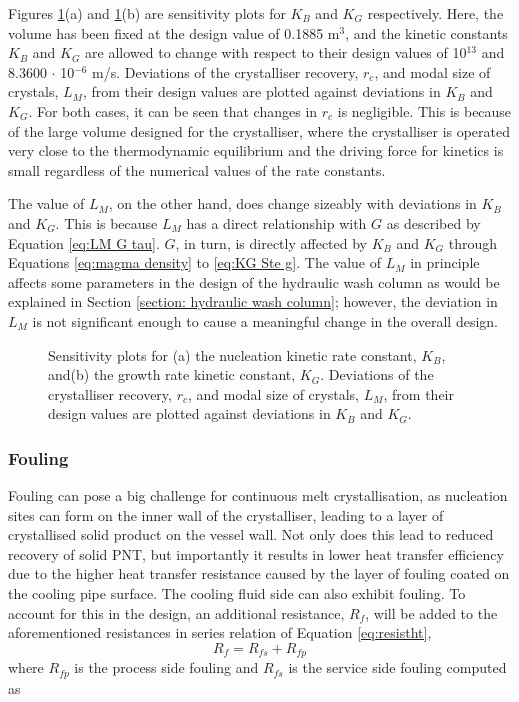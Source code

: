 Figures \ref{fig:sensitivity kinetics}(a) and \ref{fig:sensitivity kinetics}(b) are sensitivity plots for $K_B$ and $K_G$ respectively. Here, the volume has been fixed at the design value of 0.1885 m$^3$, and the kinetic constants $K_B$ and $K_G$ are allowed to change with respect to their design values of 10$^{13}$ and 8.3600 $\cdot$ 10$^{-6}$ m/s. Deviations of the crystalliser recovery, $r_c$, and modal size of crystals, $L_M$, from their design values are plotted against deviations in $K_B$ and $K_G$. For both cases, it can be seen that changes in $r_c$ is negligible. This is because of the large volume designed for the crystalliser, where the crystalliser is operated very close to the thermodynamic equilibrium and the driving force for kinetics is small regardless of the numerical values of the rate constants.

The value of $L_M$, on the other hand, does change sizeably with deviations in $K_B$ and $K_G$. This is because $L_M$ has a direct relationship with $G$ as described by Equation \ref{eq:LM G tau}. $G$, in turn, is directly affected by $K_B$ and $K_G$ through Equations \ref{eq:magma density} to \ref{eq:KG Ste g}. The value of $L_M$ in principle affects some parameters in the design of the hydraulic wash column as would be explained in Section \ref{section: hydraulic wash column}; however, the deviation in $L_M$ is not significant enough to cause a meaningful change in the overall design. 

\begin{figure}[h]
    \centering
    
    \caption{Sensitivity plots for (a) the nucleation kinetic rate constant, $K_B$, and(b) the growth rate kinetic constant, $K_G$. Deviations of the crystalliser recovery, $r_c$, and modal size of crystals, $L_M$, from their design values are plotted against deviations in $K_B$ and $K_G$. }
    \label{fig:sensitivity kinetics}
\end{figure}
   
\subsubsection{Fouling}\label{sec:fouling}

Fouling can pose a big challenge for continuous melt crystallisation, as nucleation sites can form on the inner wall of the crystalliser, leading to a layer of crystallised solid product on the vessel wall. Not only does this lead to reduced recovery of solid PNT, but importantly it results in lower heat transfer efficiency due to the higher heat transfer resistance caused by the layer of fouling coated on the cooling pipe surface. The cooling fluid side can also exhibit fouling. To account for this in the design, an additional resistance, $R_f$, will be added to the aforementioned resistances in series relation of Equation \ref{eq:resistht},
\begin{equation} \label{eq:fouling}
    R_f = R_{fs} + R_{fp}
\end{equation}
where $R_{fp}$ is the process side fouling and $R_{fs}$ is the service side fouling computed as 


